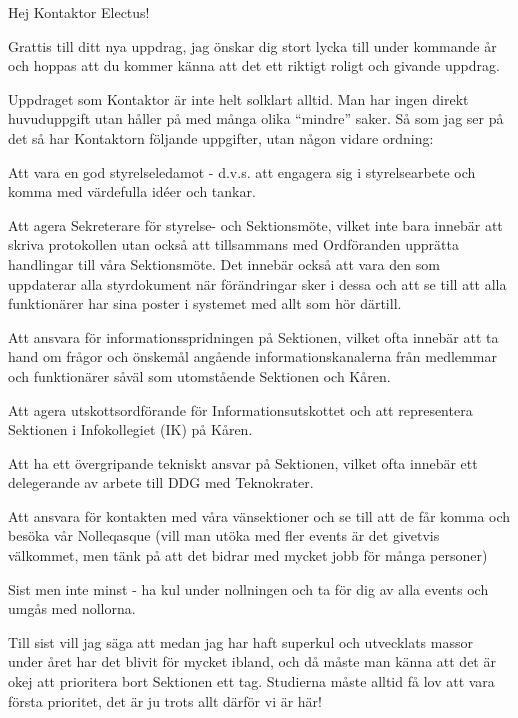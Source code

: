 \documentclass[10pt]{article}
\begin{document}
\heading{\doctitle}

Hej Kontaktor Electus!

Grattis till ditt nya uppdrag, jag önskar dig stort lycka till under kommande år och hoppas att du kommer känna att det ett riktigt roligt och givande uppdrag.

Uppdraget som Kontaktor är inte helt solklart alltid. Man har ingen direkt huvuduppgift utan håller på med många olika ``mindre'' saker. Så som jag ser på det så har Kontaktorn följande uppgifter, utan någon vidare ordning:
\begin{dashlist}
    \item Att vara en god styrelseledamot - d.v.s. att engagera sig i styrelsearbete och komma med värdefulla idéer och tankar.
    \item Att agera Sekreterare för styrelse- och Sektionsmöte, vilket inte bara innebär att skriva protokollen utan också att tillsammans med Ordföranden upprätta handlingar till våra Sektionsmöte. Det innebär också att vara den som uppdaterar alla styrdokument när förändringar sker i dessa och att se till att alla funktionärer har sina poster i systemet med allt som hör därtill.
    \item Att ansvara för informationsspridningen på Sektionen, vilket ofta innebär att ta hand om frågor och önskemål angående informationskanalerna från medlemmar och funktionärer såväl som utomstående Sektionen och Kåren.
    \item Att agera utskottsordförande för Informationsutskottet och att representera Sektionen i Infokollegiet (IK) på Kåren.
    \item Att ha ett övergripande tekniskt ansvar på Sektionen, vilket ofta innebär ett delegerande av arbete till DDG med Teknokrater.
    \item Att ansvara för kontakten med våra vänsektioner och se till att de får komma och besöka vår Nolleqasque (vill man utöka med fler events är det givetvis välkommet, men tänk på att det bidrar med mycket jobb för många personer)
    \item Sist men inte minst - ha kul under nollningen och ta för dig av alla events och umgås med nollorna.
\end{dashlist}

Till sist vill jag säga att medan jag har haft superkul och utvecklats massor under året har det blivit för mycket ibland, och då måste man känna att det är okej att prioritera bort Sektionen ett tag. Studierna måste alltid få lov att vara första prioritet, det är ju trots allt därför vi är här!
\end{document}
